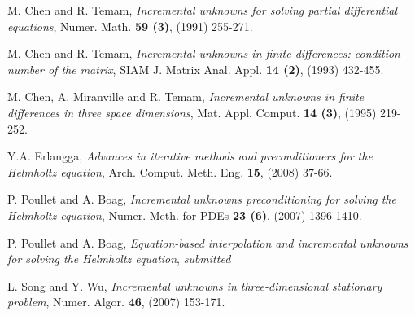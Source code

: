 \documentclass{report}
\begin{document}
\begin{references}{99}

 M. Chen and R. Temam,
{\em Incremental unknowns for solving partial differential equations},
Numer. Math. {\bf 59 (3)}, (1991) 255-271.

 M. Chen and R. Temam,
{\em Incremental unknowns in finite differences: condition number of the matrix},
SIAM J. Matrix Anal. Appl. {\bf 14 (2)}, (1993) 432-455.

 M. Chen, A. Miranville and R. Temam,
{\em Incremental unknowns in finite differences in three space dimensions},
Mat. Appl. Comput. {\bf 14 (3)}, (1995) 219-252.

 Y.A. Erlangga,
{\em Advances in iterative methods and preconditioners for the
Helmholtz equation},
Arch. Comput. Meth. Eng. {\bf 15}, (2008) 37-66.

 P. Poullet and A. Boag,
{\em Incremental unknowns preconditioning for solving the Helmholtz equation},
Numer. Meth. for PDEs {\bf 23 (6)}, (2007) 1396-1410.

 P. Poullet and A. Boag,
{\em Equation-based interpolation and incremental unknowns for solving
the Helmholtz equation}, {\it submitted}

 L. Song and Y. Wu,
{\em Incremental unknowns in three-dimensional stationary problem},
Numer. Algor. {\bf 46}, (2007) 153-171.

\end{references}
\end{document}
